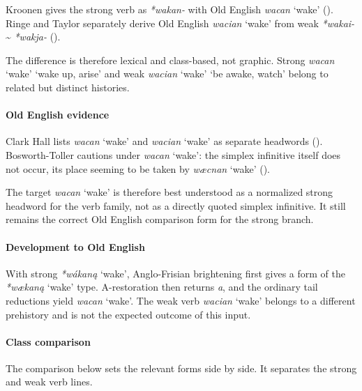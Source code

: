 \documentclass[
  british,
  a4paper,
]{article}
\providecommand{\Recon}[1]{\emph{*#1}}
\begin{document}
Kroonen gives the strong verb as \emph{*wakan-} with Old English
{\emph{wacan}} `wake' ().
Ringe and Taylor separately derive Old English {\emph{wacian}} `wake'
from weak \emph{*wakai-} \textasciitilde{} \emph{*wakja-}
().

The difference is therefore lexical and class-based, not graphic. Strong
{\emph{wacan}} `wake' `wake up, arise' and weak {\emph{wacian}} `wake'
`be awake, watch' belong to related but distinct histories.

\paragraph{Old English evidence}\label{old-english-evidence-110}

Clark Hall lists {\emph{wacan}} `wake' and {\emph{wacian}} `wake' as
separate headwords ().
Bosworth-Toller cautions under {\emph{wacan}} `wake': the simplex
infinitive itself does not occur, its place seeming to be taken by
{\emph{wæcnan}} `wake' ().

The target {\emph{wacan}} `wake' is therefore best understood as a
normalized strong headword for the verb family, not as a directly quoted
simplex infinitive. It still remains the correct Old English comparison
form for the strong branch.

\paragraph{Development to Old
English}\label{development-to-old-english-110}

With strong \Recon{wákaną} `wake', Anglo-Frisian brightening first gives
a form of the \Recon{wækaną} `wake' type. A-restoration then returns
\emph{a}, and the ordinary tail reductions yield {\emph{wacan}} `wake'.
The weak verb {\emph{wacian}} `wake' belongs to a different prehistory
and is not the expected outcome of this input.

\paragraph{Class comparison}\label{class-comparison-4}

The comparison below sets the relevant forms side by side. It separates
the strong and weak verb lines.
\end{document}
